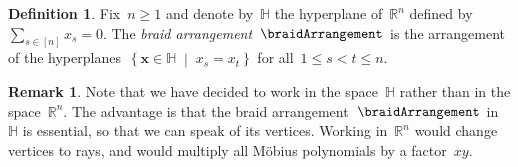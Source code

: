 \documentclass{amsart}
\newcommand{\darkblue}{\color{darkblue}} %
\theoremstyle{definition}
\newtheorem{definition}[theorem]{Definition}
\newtheorem{remark}[theorem]{Remark}
\newcommand{\R}{\mathbb{R}} %
\renewcommand{\b}[1]{{\boldsymbol{#1}}} %
\newcommand{\set}[2]{\left\{ #1 \;\middle|\; #2 \right\}} %
\newcommand{\defn}[1]{\textsl{\darkblue #1}} %
\renewcommand{\b}[1]{\boldsymbol{#1}} %
\newcommand{\HH}{\mathbb{H}} %
\begin{document}

\begin{definition}
Fix~$n \ge 1$ and denote by~$\HH$ the hyperplane of~$\R^n$ defined by~$\sum_{s \in [n]} x_s = 0$.
The \defn{braid arrangement}~$\braidArrangement$ is the arrangement of the hyperplanes~$\set{\b{x} \in \HH}{x_s = x_t}$ for all~${1 \le s < t \le n}$.
\end{definition}

\begin{remark}
\label{rem:essential}
Note that we have decided to work in the space~$\HH$ rather than in the space~$\R^n$.
The advantage is that the braid arrangement~$\braidArrangement$ in~$\HH$ is essential, so that we can speak of its vertices.
Working in~$\R^n$ would change vertices to rays, and would multiply all M\"obius polynomials by a factor~$xy$.
\end{remark}
\end{document}
